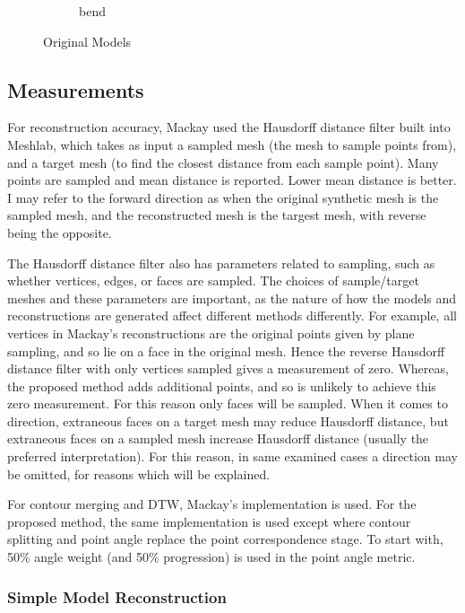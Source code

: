 \documentclass[11p, titlepage]{article}
\begin{document}
\begin{figure}[h!]
\begin{subfigure}[b]{0.3\textwidth}
         \caption{bend}
         \label{fig:bend}
     \end{subfigure}
        \caption{Original Models}
        \label{fig:original_models}
\end{figure}

\subsection{Measurements}

For reconstruction accuracy, Mackay used the Hausdorff distance filter built into Meshlab, which takes as input a sampled mesh (the mesh to sample points from), and a target mesh (to find the closest distance from each sample point). Many points are sampled and mean distance is reported. Lower mean distance is better. I may refer to the forward direction as when the original synthetic mesh is the sampled mesh, and the reconstructed mesh is the targest mesh, with reverse being the opposite. 

The Hausdorff distance filter also has parameters related to sampling, such as whether vertices, edges, or faces are sampled. The choices of sample/target meshes and these parameters are important, as the nature of how the models and reconstructions are generated affect different methods differently. For example, all vertices in Mackay's reconstructions are the original points given by plane sampling, and so lie on a face in the original mesh. Hence the reverse Hausdorff distance filter with only vertices sampled gives a measurement of zero. Whereas, the proposed method adds additional points, and so is unlikely to achieve this zero measurement. For this reason only faces will be sampled. When it comes to direction, extraneous faces on a target mesh may reduce Hausdorff distance, but extraneous faces on a sampled mesh increase Hausdorff distance (usually the preferred interpretation). For this reason, in same examined cases a direction may be omitted, for reasons which will be explained.

For contour merging and DTW, Mackay's implementation is used. For the proposed method, the same implementation is used except where contour splitting and point angle replace the point correspondence stage. To start with, 50\% angle weight (and 50\% progression) is used in the point angle metric.
\pagebreak

\subsubsection{Simple Model Reconstruction}
\end{document}
